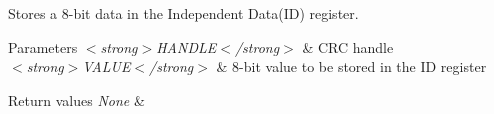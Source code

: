 Stores a 8-\/bit data in the Independent Data(\+I\+D) register. 


\begin{DoxyParams}{Parameters}
{\em $<$strong$>$\+H\+A\+N\+D\+L\+E$<$/strong$>$} & C\+RC handle \\
\hline
{\em $<$strong$>$\+V\+A\+L\+U\+E$<$/strong$>$} & 8-\/bit value to be stored in the ID register \\
\hline
\end{DoxyParams}

\begin{DoxyRetVals}{Return values}
{\em None} & \\
\hline
\end{DoxyRetVals}

